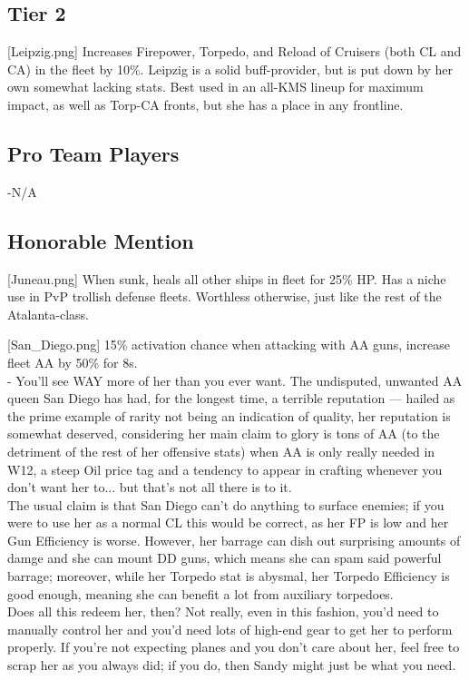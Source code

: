 \newpage
\subsection{Tier 2}
[Leipzig.png]
{Increases Firepower, Torpedo, and Reload of Cruisers (both CL and CA) in the fleet by 10\%.}
{}
{Leipzig is a solid buff-provider, but is put down by her own somewhat lacking stats. Best used in an all-KMS lineup for maximum impact, as well as Torp-CA fronts, but she has a place in any frontline.}

 
\newpage
\subsection{Pro Team Players}
-N/A
 
 
\newpage
\subsection{Honorable Mention}
[Juneau.png]
{When sunk, heals all other ships in fleet for 25\% HP.}
{}
{Has a niche use in PvP trollish defense fleets. Worthless otherwise, just like the rest of the Atalanta-class.}
 
[San_Diego.png]
{15\% activation chance when attacking with AA guns, increase fleet AA by 50\% for 8s.\\
- You'll see WAY more of her than you ever want.}
{The undisputed, unwanted AA queen}
{San Diego has had, for the longest time, a terrible reputation --- hailed as the prime example of rarity not being an indication of quality, her reputation is somewhat deserved, considering her main claim to glory is tons of AA (to the detriment of the rest of her offensive stats) when AA is only really needed in W12, a steep Oil price tag and a tendency to appear in crafting whenever you don't want her to... but that's not all there is to it.\\
The usual claim is that San Diego can't do anything to surface enemies; if you were to use her as a normal CL this would be correct, as her FP is low and her Gun Efficiency is worse. However, her barrage can dish out surprising amounts of damge and she can mount DD guns, which means she can spam said powerful barrage; moreover, while her Torpedo stat is abysmal, her Torpedo Efficiency is good enough, meaning she can benefit a lot from auxiliary torpedoes.\\
Does all this redeem her, then? Not really, even in this fashion, you'd need to manually control her and you'd need lots of high-end gear to get her to perform properly. If you're not expecting planes and you don't care about her, feel free to scrap her as you always did; if you do, then Sandy might just be what you need.}

